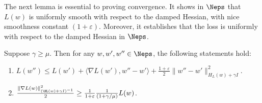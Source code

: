 The next lemma is essential to proving convergence. It shows in $\Neps$ that $L(w)$ is uniformly smooth with respect to the damped Hessian, with nice smoothness constant $(1+\varepsilon)$. 
Moreover, it establishes that the loss is uniformly \PL with respect to the damped Hessian in $\Neps$. 
\begin{lemma}
\label{lemma:local-sm-pl}
    Suppose $\gamma \geq \mu$. Then 
    for any $w,w',w''\in \Neps$, the following statements hold:
    \begin{enumerate}
        \item $L(w'')\leq L(w')+\langle \nabla L(w'),w''-w'\rangle +\frac{1+\varepsilon}{2}\|w''-w'\|_{H_L(w)+\gamma I}^2$.
        \item $\frac{\|\nabla L(w)\|_{(\HL(w)+\gamma I)^{-1}}^2}{2}\geq \frac{1}{1+\varepsilon}\frac{1}{\left(1+\gamma/\mu\right)}L(w)$.
    \end{enumerate}
\end{lemma}

